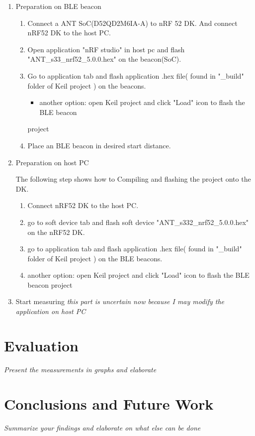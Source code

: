 \documentclass{article}
\begin{document}
\begin{enumerate}
\item Preparation on BLE beacon
	\begin{enumerate}
	\item Connect a ANT SoC(D52QD2M6IA-A) to nRF 52 DK. And connect nRF52 DK to the host PC. 
	\item Open application "nRF studio" in host pc and flash "ANT\_s33\_nrf52\_5.0.0.hex" on the beacon(SoC).
	\item Go to application tab and flash application .hex file( found in "\_build" folder of Keil project ) on the beacons.
		\begin{itemize}
		 \item another option: open Keil project and click "Load" icon to flash the BLE beacon
		\end{itemize}
   project
	\item Place an BLE beacon in desired start distance.

\end{enumerate}

\item Preparation on host PC

The following step shows how to Compiling and flashing the project onto the DK.

	\begin{enumerate}
	\item Connect nRF52 DK to the host PC.
	\item go to soft device tab and flash soft device "ANT\_s332\_nrf52\_5.0.0.hex" on the nRF52 DK.
	\item go to application tab and flash application .hex file( found in "\_build" folder of Keil project ) on the BLE beacons.
	\item another option: open Keil project and click "Load" icon to flash the BLE beacon project
	\end{enumerate}

\item Start measuring
\textit{this part is uncertain now because I may modify the application on host PC }
\end{enumerate}

\section{Evaluation}
\textit{Present the measurements in graphs and elaborate}

\section{Conclusions and Future Work}
\textit{Summarize your findings and elaborate on what else can be done}
\end{document}
